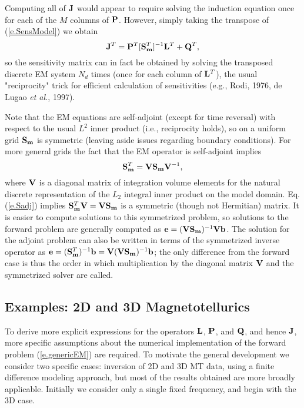 Computing all of ${\bf J}$ would appear to require
solving the induction equation once for each of the
$M$ columns of ${\bf P}$.
However, simply taking the transpose of (\ref{e.SensModel}) we obtain
\begin{equation}
\label{e.SensAdjtApp}
{\bf J}^T = {\bf P}^T [{\bf S}_{{\bf m}}^T]^{-1} {\bf L}^T + {\bf Q}^T  ,
\end{equation}
so the sensitivity matrix can in fact be obtained by solving
the transposed discrete EM system $N_d$ times
(once for each column of ${\bf L}^T$),
the usual "reciprocity" trick for efficient
calculation of sensitivities (e.g., Rodi, 1976, de Lugao {\it et al.}, 1997).

Note that the EM equations are self-adjoint 
(except for time reversal) with respect to
the usual $L^2$ inner product (i.e., reciprocity
holds), so on a uniform grid ${\bf S}_{\bf m}$ is symmetric
(leaving aside issues regarding boundary conditions).  
For more general grids the fact that the EM operator is self-adjoint
implies 
\begin{equation}
\label{e.Sadj}
{\bf S}_{\bf m}^T = {\bf V} {\bf S}_{\bf m} {\bf V}^{-1},
\end{equation}
where ${\bf V}$ is a diagonal matrix of
integration volume elements for the natural 
discrete representation of the $L_2$
integral inner product on the model domain.   
Eq. (\ref{e.Sadj}) implies
${\bf S}_{\bf m}^T {\bf V} = {\bf V} {\bf S}_{\bf m} $ is a symmetric
(though not Hermitian) matrix.
It is easier to compute solutions to this symmetrized problem,
so solutions to the forward problem are generally computed
as ${\bf e} =  ({\bf V} {\bf S}_{\bf m} ) ^{-1} {\bf V} {\bf b}$.
The solution for the adjoint problem can also be written
in terms of the symmetrized inverse operator as
${\bf e} = ({\bf S}_{\bf m}^T)^{-1} {\bf b} = {\bf V} ({\bf V} {\bf S}_{\bf m} ) ^{-1} {\bf b}$; the
only difference from the forward case is thus the
order in which multiplication by the diagonal matrix $\bf V$ and
the symmetrized solver are called.

\subsection{Examples: 2D and 3D Magnetotellurics}

To derive more explicit expressions for the operators
${\bf L}$, ${\bf P}$, and ${\bf Q}$, and hence ${\bf J}$,
more specific assumptions about the numerical implementation
of the forward problem (\ref{e.genericEM}) are required.  To motivate
the general development we consider two specific cases:
inversion of 2D and 3D MT data, 
using a finite difference modeling approach,
but most of the results obtained are more broadly applicable.
Initially we consider only a single fixed frequency,
and begin with the 3D case.

